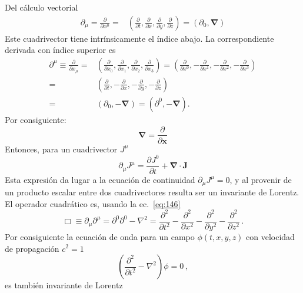 \begin{frame}
  Del cálculo vectorial
  \begin{align}
      \partial_\mu=\frac{\partial}{\partial x^\mu}=&\left(
    \frac{\partial}{\partial t},\frac{\partial}{\partial x},\frac{\partial}{\partial y},\frac{\partial}{\partial z}
  \right)
  =(\partial_0,\boldsymbol{\nabla})
  \end{align}
Este cuadrivector tiene intrínsicamente el índice abajo. La correspondiente derivada con índice superior es  
\begin{align}
  \partial^\mu\equiv\frac{\partial}{\partial x_\mu}=&
  \left(
    \frac{\partial}{\partial x_0},\frac{\partial}{\partial x_1},\frac{\partial}{\partial x_2},\frac{\partial}{\partial x_3}
  \right)=\left(
    \frac{\partial}{\partial x^0},-\frac{\partial}{\partial x^1},-\frac{\partial}{\partial x^2},-\frac{\partial}{\partial x^3}
  \right)\nonumber\\
  =&\left(
    \frac{\partial}{\partial t},-\frac{\partial}{\partial x},-\frac{\partial}{\partial y},-\frac{\partial}{\partial z}
  \right)\nonumber\\
  =&(\partial_0,-\boldsymbol{\nabla})=(\partial^0,-\boldsymbol{\nabla}).
\end{align}
Por consiguiente:
\begin{equation}
  \label{eq:nabla}
  \boldsymbol{\nabla}=\frac{\partial}{\partial\mathbf{x}}
\end{equation}
Entonces, para un cuadrivector $J^{\mu}$
\begin{equation}
  \label{eq:ecncontiJ}
  \partial_\mu J^\mu=\frac{\partial J^0}{\partial t}+\boldsymbol{\nabla}\cdot\boldsymbol{J}
\end{equation}
Esta expresión da lugar a la ecuación de continuidad $\partial_\mu J^\mu=0$, y al provenir de un producto escalar entre dos cuadrivectores resulta ser un invariante de Lorentz.
El operador cuadrático es, usando la ec.~\eqref{eq:146}
\begin{equation}
  \label{eq:dalambertian}
  \Box\equiv \partial_\mu\partial^\mu=\partial^0\partial^0-\nabla^2 =\frac{\partial^2}{\partial t^2}-\frac{\partial^2}{\partial x^2}-\frac{\partial^2}{\partial y^2}-\frac{\partial^2}{\partial z^2}\,.
\end{equation}
Por consiguiente la ecuaci\'on de onda para un campo $\phi(t,x,y,z)$  con velocidad de propagación $c^2=1$
\begin{equation}
  \left(
\frac{\partial^2}{\partial t^2}-\nabla^2
  \right)\phi=0\,,
\end{equation}
es también invariante de Lorentz
\end{frame}

